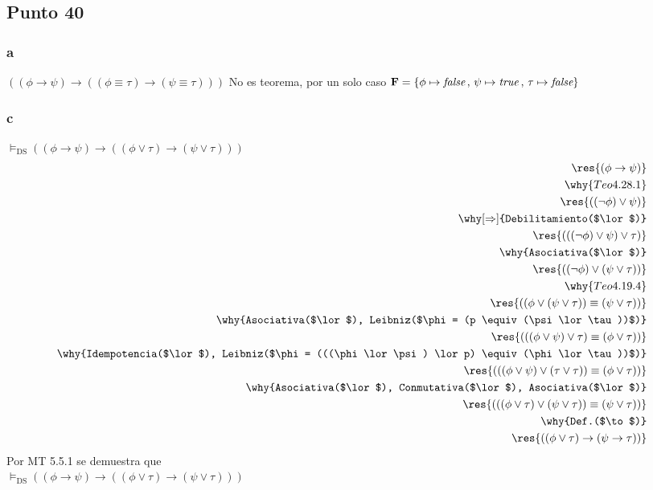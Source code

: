 \documentclass{article}
\begin{document}
\subsection{Punto 40}
\subsubsection{a}
\begin{logicenv}[5]{$((\phi \to \psi) \to ((\phi \equiv \tau) \to (\psi \equiv \tau)))$}
    No es teorema, por un solo caso $\mathbf{F} = \{\phi \mapsto \textit{false}\,,\,\psi \mapsto \textrm{\textit{true}}\,,\,\tau \mapsto \textit{false}\}$
\end{logicenv}
\subsubsection{c}
\label{P40-c}
\begin{logicenv}[5]{$\vDash_\text{DS} ((\phi \to \psi) \to ((\phi \lor \tau) \to (\psi \lor \tau)))$}
    \begin{align*}
            \res{(\phi \to \psi)}\\
        \why{Teo 4.28.1}\\
            \res{((\neg \phi) \lor \psi)}\\
        \why[\Rightarrow]{Debilitamiento($\lor$)}\\
            \res{(((\neg \phi) \lor \psi) \lor \tau)}\\
        \why{Asociativa($\lor$)}\\
            \res{((\neg \phi) \lor (\psi \lor \tau))}\\
        \why{Teo 4.19.4}\\
            \res{((\phi \lor (\psi \lor \tau)) \equiv (\psi \lor \tau))}\\
        \why{Asociativa($\lor$), Leibniz($\phi = (p \equiv (\psi \lor \tau))$)}\\
            \res{(((\phi \lor \psi) \lor \tau) \equiv (\phi \lor \tau))}\\
        \why{Idempotencia($\lor$), Leibniz($\phi = (((\phi \lor \psi) \lor p) \equiv (\phi \lor \tau))$)}\\
            \res{(((\phi \lor \psi) \lor (\tau \lor \tau)) \equiv (\phi \lor \tau))}\\
        \why{Asociativa($\lor$), Conmutativa($\lor$), Asociativa($\lor$)}\\
            \res{(((\phi \lor \tau) \lor (\psi \lor \tau)) \equiv (\psi \lor \tau))}\\
        \why{Def.($\to$)}\\
            \res{((\phi \lor \tau) \to (\psi \to \tau))}
    \end{align*}
    Por MT 5.5.1 se demuestra que\\
    $\vDash_\text{DS} ((\phi \to \psi) \to ((\phi \lor \tau) \to (\psi \lor \tau)))$
\end{logicenv}
\end{document}
